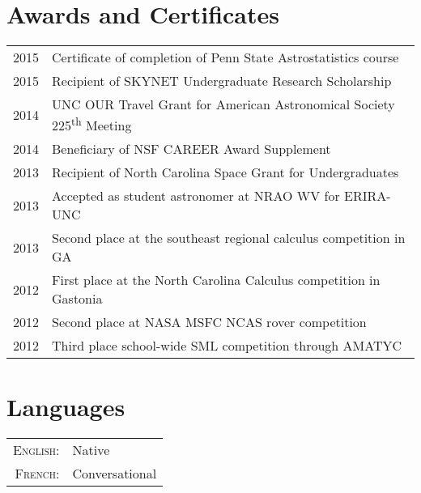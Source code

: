 \documentclass[a4paper,10pt]{article} %
\begin{document}

\section{Awards and Certificates}

\begin{tabular}{rl}
2015 & Certificate of completion of Penn State Astrostatistics course\\
2015 & Recipient of SKYNET Undergraduate Research Scholarship\\
2014 & UNC OUR Travel Grant for American Astronomical Society 225\textsuperscript{th} Meeting\\
2014 & Beneficiary of NSF CAREER Award Supplement\\
2013 & Recipient of North Carolina Space Grant for Undergraduates\\
2013 & Accepted as student astronomer at NRAO WV for ERIRA-UNC\\
2013 & Second place at the southeast regional calculus competition in GA\\
2012 & First place at the North Carolina Calculus competition in Gastonia \\
2012 & Second place at NASA MSFC NCAS rover competition\\
2012 & Third place school-wide SML competition through AMATYC\\
\end{tabular}
\bigskip


\section{Languages}

\begin{tabular}{rl}

\textsc{English:} & Native\\

\textsc{French:} & Conversational\\

\end{tabular}
\bigskip
\end{document}
